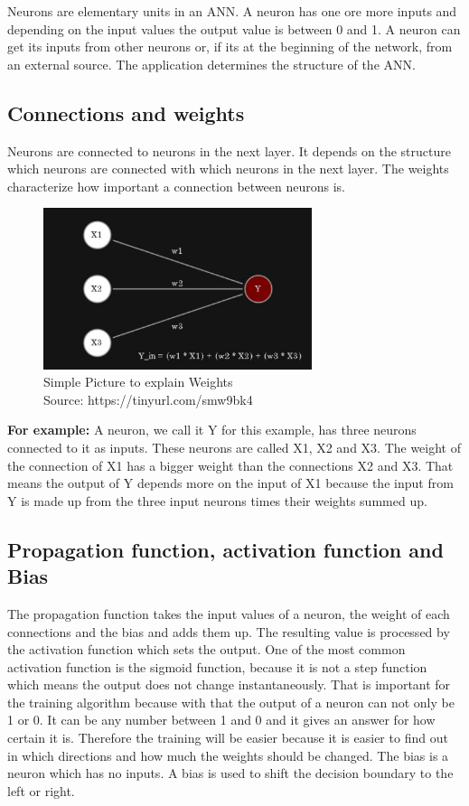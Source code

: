 Neurons are elementary units in an ANN. A neuron has one ore more inputs and depending on the input values the output value is between 0 and 1. A neuron can get its inputs from other neurons or, if its at the beginning of the network, from an external source. The application determines the structure of the ANN.


\subsection{Connections and weights}

Neurons are connected to neurons in the next layer. It depends on the structure which neurons are connected with which neurons in the next layer. The weights characterize how important a connection between neurons is. 

\begin{figure}[h]
	\centering
	\includegraphics[width=0.7\textwidth]{./media/images/weights1.jpg}
  	\caption{Simple Picture to explain  Weights
  	\\Source: https://tinyurl.com/smw9bk4}
  	\label{Gvon}
\end{figure}

\textbf{For example:}\newline
A neuron, we call it Y for this example, has three neurons connected to it as inputs. These neurons are called X1, X2 and X3. The weight of the connection of X1 has a bigger weight than the connections X2 and X3. That means the output of Y depends more on the input of X1 because the input from Y is made up from the three input neurons times their weights summed up.

\subsection{Propagation function, activation function and Bias}

The propagation function takes the input values of a neuron, the weight of each connections and the bias and adds them up. The resulting value is processed by the activation function which sets the output. One of the most common activation function is the sigmoid function, because it is not a step function which means the output does not  change instantaneously. That is important for the training algorithm because with that the output of a neuron can not only be 1 or 0. It can be any number between 1 and 0 and it gives an answer for how certain it is. Therefore the training will be easier because it is easier to find out in which directions and how much the weights should be changed. The bias is a neuron which has no inputs. A bias is used to shift the decision boundary to the left or right.

